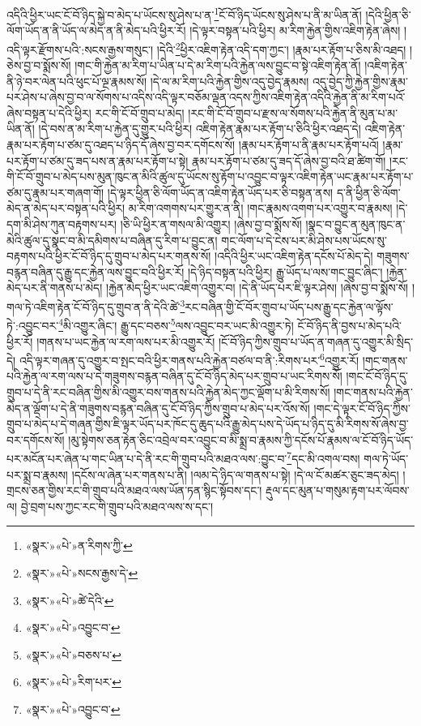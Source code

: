 འདིའི་ཕྱིར་ཡང་ངོ་བོ་ཉིད་སྐྱེ་བ་མེད་པ་ཡོངས་སུ་ཤེས་པ་ན་\footnote{«སྣར་»«པེ་»ན་རིགས་ཀྱི་}ངོ་བོ་ཉིད་ཡོངས་སུ་ཤེས་པ་ནི་མ་ཡིན་ནོ། །དེའི་ཕྱིན་ཅི་ལོག་ཡོད་ན་ནི་ཡོད་ལ་མེད་ན་ནི་མེད་པའི་ཕྱིར་རོ། །དེ་ལྟར་བསྟན་པའི་ཕྱིར། མ་རིག་རྐྱེན་གྱིས་འཇིག་རྟེན་ཞེས། །འདི་ལྟར་རྫོགས་པའི་:སངས་རྒྱས་གསུང་། །དེའི་\footnote{«སྣར་»«པེ་»སངས་རྒྱས་དེ་}ཕྱིར་འཇིག་རྟེན་འདི་དག་ཀྱང་། །རྣམ་པར་རྟོག་པ་ཅིས་མི་འཐད། །ཅེས་བྱ་བ་སྨོས་སོ། །གང་གི་རྐྱེན་མ་རིག་པ་ཡིན་པ་དེ་མ་རིག་པའི་རྐྱེན་ལས་བྱུང་བ་སྟེ་འཇིག་རྟེན་ནོ། །འཇིག་རྟེན་ནི་ཉེ་བར་ལེན་པའི་ཕུང་པོ་ལྔ་རྣམས་སོ། །དེ་ལ་མ་རིག་པའི་རྐྱེན་གྱིས་འདུ་བྱེད་རྣམས། འདུ་བྱེད་ཀྱི་རྐྱེན་གྱིས་རྣམ་པར་ཤེས་པ་ཞེས་བྱ་བ་ལ་སོགས་པ་འདིས་འདི་ལྟར་བཅོམ་ལྡན་འདས་ཀྱིས་འཇིག་རྟེན་འདིའི་རྐྱེན་ནི་མ་རིག་པའོ་ཞེས་བསྟན་པ་དེའི་ཕྱིར། རང་གི་ངོ་བོ་གྲུབ་པ་མེད། །རང་གི་ངོ་བོ་གྲུབ་པ་རྫས་ལ་སོགས་པའི་རྐྱེན་ནི་མུན་པ་མ་ཡིན་ནོ། །དེ་བས་ན་མ་རིག་པ་རྐྱེན་དུ་གྱུར་པའི་ཕྱིར། འཇིག་རྟེན་རྣམ་པར་རྟོག་པ་ཅིའི་ཕྱིར་འཐད་དེ། འཇིག་རྟེན་རྣམ་པར་རྟོག་པ་ཙམ་དུ་འཐད་པ་ཉིད་དོ་ཞེས་བྱ་བར་དགོངས་སོ། །རྣམ་པར་རྟོག་པ་ནི་རྣམ་པར་རྟོག་པའོ། །རྣམ་པར་རྟོག་པ་ཙམ་དུ་ཟད་པས་ན་རྣམ་པར་རྟོག་པ་སྟེ། རྣམ་པར་རྟོག་པ་ཙམ་དུ་ཟད་དོ་ཞེས་བྱ་བའི་ཐ་ཚིག་གོ། །རང་གི་ངོ་བོ་གྲུབ་པ་མེད་པས་མུན་ཁུང་ན་མིའི་ཚུལ་དུ་ཡོངས་སུ་རྟོག་པ་འབྱུང་བ་ལྟར་འཇིག་རྟེན་ཡང་རྣམ་པར་རྟོག་པ་ཙམ་དུ་རྣམ་པར་གཞག་གོ། །དེ་ལྟར་ཕྱིན་ཅི་ལོག་ཡོད་ན་འཇིག་རྟེན་ཡོད་པར་ཅི་བསྟན་ནས། ད་ནི་ཕྱིན་ཅི་ལོག་མེད་ན་མེད་པར་བསྟན་པའི་ཕྱིར། མ་རིག་འགགས་པར་གྱུར་ན་ནི། །གང་རྣམས་འགག་པར་འགྱུར་བ་རྣམས། །དེ་དག་མི་ཤེས་ཀུན་བརྟགས་པར། །ཅི་ཡི་ཕྱིར་ན་གསལ་མི་འགྱུར། །ཞེས་བྱ་བ་སྨོས་སོ། །སྣང་བ་བྱུང་ན་མུན་ཁུང་ན་མེའི་ཚུལ་དུ་སྣང་བ་མི་དམིགས་པ་བཞིན་དུ་རིག་པ་བྱུང་ན། གང་ལོག་པ་དེ་ངེས་པར་མི་ཤེས་པས་ཡོངས་སུ་བརྟགས་པའི་ཕྱིར་ངོ་བོ་ཉིད་དུ་གྲུབ་པ་མེད་པར་གནས་སོ། །འདིའི་ཕྱིར་ཡང་འཇིག་རྟེན་དངོས་པོ་མེད་དེ། གཟུགས་བརྙན་བཞིན་དུ་རྒྱུ་དང་རྐྱེན་ལས་བྱུང་བའི་ཕྱིར་རོ། །དེ་ཉིད་བསྟན་པའི་ཕྱིར། རྒྱུ་ཡོད་པ་ལས་གང་བྱུང་ཞིང་། །རྐྱེན་མེད་པར་ནི་གནས་པ་མེད། །རྐྱེན་མེད་ཕྱིར་ཡང་འཇིག་འགྱུར་བ། །དེ་ནི་ཡོད་པར་ཇི་ལྟར་ཤེས། །ཞེས་བྱ་བ་སྨོས་སོ། །གལ་ཏེ་འཇིག་རྟེན་ངོ་བོ་ཉིད་དུ་གྲུབ་ན་ནི་དེའི་ཚེ་\footnote{«སྣར་»«པེ་»ཚེ་དེའི་}རང་བཞིན་གྱི་ངོ་བོར་གྲུབ་པ་ཡོད་པས་རྒྱུ་དང་རྐྱེན་ལ་ལྟོས་ཏེ་:འབྱུང་བར་\footnote{«སྣར་»«པེ་»འབྱུང་བ་}མི་འགྱུར་ཞིང་། རྒྱུ་དང་བཅས་\footnote{«སྣར་»«པེ་»བཅས་པ་}ལས་འབྱུང་བར་ཡང་མི་འགྱུར་ཏེ། ངོ་བོ་ཉིད་ནི་བྱས་པ་མེད་པའི་ཕྱིར་རོ། །གནས་པ་ཡང་རྐྱེན་ལ་རག་ལས་པར་མི་འགྱུར་རོ། །ངོ་བོ་ཉིད་ཀྱིས་གྲུབ་པ་ཡོད་ན་གཞན་དུ་འགྱུར་མི་སྲིད་དེ། འདི་ལྟར་གཞན་དུ་འགྱུར་བ་སྤང་བའི་ཕྱིར་གནས་པའི་རྐྱེན་བཙལ་བ་ནི་:རིགས་པར་\footnote{«སྣར་»«པེ་»རིག་པར་}འགྱུར་རོ། །གང་གནས་པའི་རྐྱེན་ལ་རག་ལས་པ་དེ་གཟུགས་བརྙན་བཞིན་དུ་ངོ་བོ་ཉིད་མེད་པར་གྲུབ་པ་ཡང་རིགས་སོ། །གང་ངོ་བོ་ཉིད་དུ་གྲུབ་པ་དེ་ནི་རང་བཞིན་གྱིས་མི་འགྱུར་བས་གནས་པའི་རྐྱེན་མེད་ཀྱང་ལྡོག་པ་མི་རིགས་སོ། །གང་གནས་པའི་རྐྱེན་མེད་ན་ལྡོག་པ་དེ་ནི་གཟུགས་བརྙན་བཞིན་དུ་ངོ་བོ་ཉིད་ཀྱིས་གྲུབ་པ་མེད་པར་འོས་སོ། །གང་དེ་ལྟར་ངོ་བོ་ཉིད་ཀྱིས་གྲུབ་པ་མེད་པ་དེ་གཞན་གྱིས་ཇི་ལྟར་ཡོད་པར་ཁོང་དུ་ཆུད་པའི་རྒྱུ་མེད་པས་དེ་ཡོད་པ་ཉིད་དུ་མི་རིགས་སོ་ཞེས་བྱ་བར་དགོངས་སོ། །མུ་སྟེགས་ཅན་རྟེན་ཅིང་འབྲེལ་བར་འབྱུང་བ་མི་སྨྲ་བ་རྣམས་ཀྱི་དངོས་པོ་རྣམས་ལ་ངོ་བོ་ཉིད་ཡོད་པར་མངོན་པར་ཞེན་པ་གང་ཡིན་པ་དེ་ནི་རང་གི་གྲུབ་པའི་མཐའ་ལས་:བྱུང་བ་\footnote{«སྣར་»«པེ་»འབྱུང་བ་}དང་མི་འགལ་བས། གལ་ཏེ་ཡོད་པར་སྨྲ་བ་རྣམས། །དངོས་ལ་ཞེན་པར་གནས་པ་ནི། །ལམ་དེ་ཉིད་ལ་གནས་པ་སྟེ། །དེ་ལ་ངོ་མཚར་ཅུང་ཟད་མེད། །གྲངས་ཅན་གྱིས་རང་གི་གྲུབ་པའི་མཐའ་ལས་ཡོན་ཏན་སྙིང་སྟོབས་དང་། རྡུལ་དང་མུན་པ་གསུམ་རྟག་པར་ལོབས་ལ། བྱེ་བྲག་པས་ཀྱང་རང་གི་གྲུབ་པའི་མཐའ་ལས་ས་དང་། 